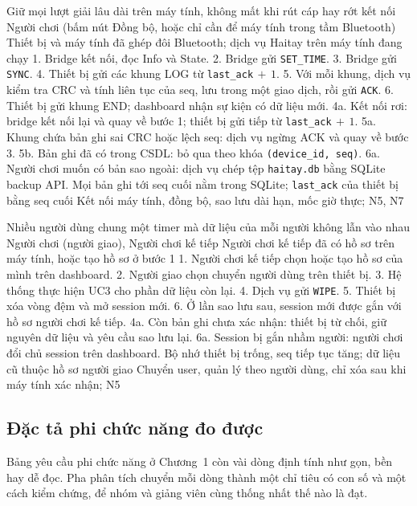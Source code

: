{Giữ mọi lượt giải lâu dài trên máy tính, không mất khi rút cáp hay rớt kết nối}
{Người chơi (bấm nút Đồng bộ, hoặc chỉ cần để máy tính trong tầm Bluetooth)}
{Thiết bị và máy tính đã ghép đôi Bluetooth; dịch vụ Haitay trên máy tính đang chạy}
{1. Bridge kết nối, đọc Info và State. 2. Bridge gửi \texttt{SET\_TIME}. 3. Bridge gửi \texttt{SYNC}. 4. Thiết bị gửi các khung LOG từ \texttt{last\_ack}$\,+\,1$. 5. Với mỗi khung, dịch vụ kiểm tra CRC và tính liên tục của seq, lưu trong một giao dịch, rồi gửi \texttt{ACK}. 6. Thiết bị gửi khung END; dashboard nhận sự kiện có dữ liệu mới.}
{4a. Kết nối rơi: bridge kết nối lại và quay về bước 1; thiết bị gửi tiếp từ \texttt{last\_ack}$\,+\,1$. 5a. Khung chứa bản ghi sai CRC hoặc lệch seq: dịch vụ ngừng ACK và quay về bước 3. 5b. Bản ghi đã có trong CSDL: bỏ qua theo khóa \texttt{(device\_id, seq)}. 6a. Người chơi muốn có bản sao ngoài: dịch vụ chép tệp \texttt{haitay.db} bằng SQLite backup API.}
{Mọi bản ghi tới seq cuối nằm trong SQLite; \texttt{last\_ack} của thiết bị bằng seq cuối}
{Kết nối máy tính, đồng bộ, sao lưu dài hạn, mốc giờ thực; N5, N7}

{Nhiều người dùng chung một timer mà dữ liệu của mỗi người không lẫn vào nhau}
{Người chơi (người giao), Người chơi kế tiếp}
{Người chơi kế tiếp đã có hồ sơ trên máy tính, hoặc tạo hồ sơ ở bước 1}
{1. Người chơi kế tiếp chọn hoặc tạo hồ sơ của mình trên dashboard. 2. Người giao chọn chuyển người dùng trên thiết bị. 3. Hệ thống thực hiện UC3 cho phần dữ liệu còn lại. 4. Dịch vụ gửi \texttt{WIPE}. 5. Thiết bị xóa vòng đệm và mở session mới. 6. Ở lần sao lưu sau, session mới được gắn với hồ sơ người chơi kế tiếp.}
{4a. Còn bản ghi chưa xác nhận: thiết bị từ chối, giữ nguyên dữ liệu và yêu cầu sao lưu lại. 6a. Session bị gắn nhầm người: người chơi đổi chủ session trên dashboard.}
{Bộ nhớ thiết bị trống, seq tiếp tục tăng; dữ liệu cũ thuộc hồ sơ người giao}
{Chuyển user, quản lý theo người dùng, chỉ xóa sau khi máy tính xác nhận; N5}

\subsection{Đặc tả phi chức năng đo được}
Bảng yêu cầu phi chức năng ở Chương~1 còn vài dòng định tính như gọn, bền hay dễ đọc. Pha phân tích chuyển mỗi dòng thành một chỉ tiêu có con số và một cách kiểm chứng, để nhóm và giảng viên cùng thống nhất thế nào là đạt.

